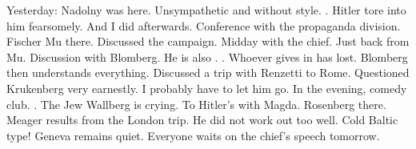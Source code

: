 Yesterday: Nadolny was here. Unsympathetic and without style. . Hitler tore into him fearsomely. And I did afterwards. Conference with the propaganda division. Fischer Mu there. Discussed the campaign. Midday with the chief. Just back from Mu. Discussion with Blomberg. He is also . .  Whoever gives in has lost. Blomberg then understands everything. Discussed a trip with Renzetti to Rome. Questioned Krukenberg very earnestly. I probably have to let him go. In the evening, comedy club. . The Jew Wallberg is crying. To Hitler's with Magda. Rosenberg there. Meager results from the London trip. He did not work out too well. Cold Baltic type! Geneva remains quiet. Everyone waits on the chief's speech tomorrow.